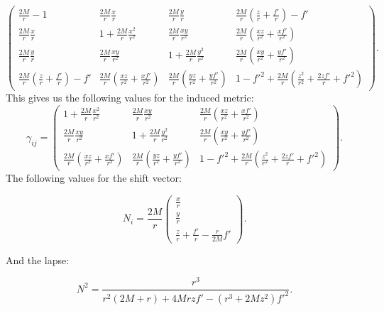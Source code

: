 \documentclass[twoside, openright]{RadboudReport}
\begin{document}
\begin{equation*}
	\begin{pmatrix}
	    \frac{2M}{r}-1 & \frac{2M}{r}\frac{x}{r} & \frac{2M}{r}\frac{y}{r} & \frac{2M}{r}\left(\frac{z}{r}+\frac{f'}{r}\right)-f'\\
	    \frac{2M}{r}\frac{x}{r} & 1+\frac{2M}{r}\frac{x^2}{r^2} & \frac{2M}{r}\frac{xy}{r^2} &\frac{2M}{r}\left(\frac{xz}{r^2}+\frac{xf'}{r^2}\right)\\
	    \frac{2M}{r}\frac{y}{r} & \frac{2M}{r}\frac{xy}{r^2} & 1+\frac{2M}{r}\frac{y^2}{r^2} &\frac{2M}{r}\left(\frac{xy}{r^2}+\frac{yf'}{r^2}\right)\\
	    \frac{2M}{r}\left(\frac{z}{r}+\frac{f'}{r}\right)-f' & \frac{2M}{r}\left(\frac{xz}{r^2}+\frac{xf'}{r^2}\right) & \frac{2M}{r}\left(\frac{yz}{r^2}+\frac{yf'}{r^2}\right)  & 1 - f'^2 + \frac{2M}{r}\left(\frac{z^2}{r^2}+\frac{2zf'}{r}+f'^2\right)
	\end{pmatrix}.
\end{equation*}
This gives us the following values for the induced metric:
\begin{equation}
	\gamma_{ij}=
	\begin{pmatrix}
	     1+\frac{2M}{r}\frac{x^2}{r^2} & \frac{2M}{r}\frac{xy}{r^2} &\frac{2M}{r}\left(\frac{xz}{r^2}+\frac{xf'}{r^2}\right)\\
	     \frac{2M}{r}\frac{xy}{r^2} & 1+\frac{2M}{r}\frac{y^2}{r^2} &\frac{2M}{r}\left(\frac{xy}{r^2}+\frac{yf'}{r^2}\right)\\
	     \frac{2M}{r}\left(\frac{xz}{r^2}+\frac{xf'}{r^2}\right) & \frac{2M}{r}\left(\frac{yz}{r^2}+\frac{yf'}{r^2}\right)  & 1 - f'^2 + \frac{2M}{r}\left(\frac{z^2}{r^2}+\frac{2zf'}{r}+f'^2\right)
	\end{pmatrix}.
\end{equation}
The following values for the shift vector:

\begin{equation}
	N_i = 
    \frac{2M}{r}\begin{pmatrix}
     \frac{x}{r} \\ 
     \frac{y}{r} \\ 
     \frac{z}{r}+\frac{f'}{r}-\frac{r}{2M}f'
\end{pmatrix}.
\end{equation}

And the lapse:

\begin{equation}
    N^2 = \frac{r^3}{r^2(2M+r)+4Mrzf'-(r^3+2Mz^2)f'^2}.
\end{equation}
\end{document}
